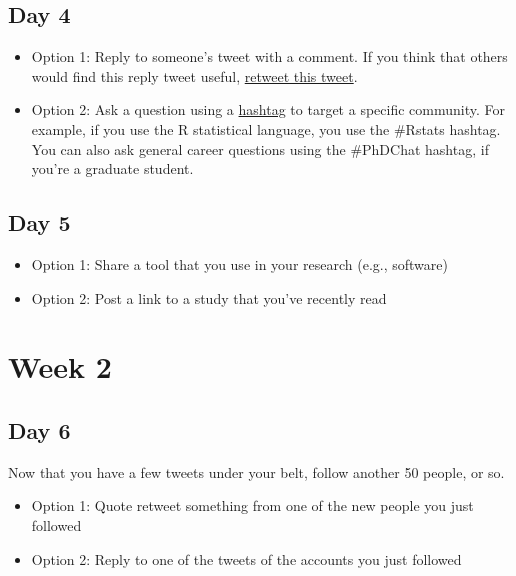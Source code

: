 \documentclass[
]{book}
\providecommand{\tightlist}{%
  \setlength{\itemsep}{0pt}\setlength{\parskip}{0pt}}
\begin{document}
\hypertarget{day-4}{%
\subsection*{Day 4}\label{day-4}}

\begin{itemize}
\tightlist
\item
  Option 1: Reply to someone's tweet with a comment. If you think that others would find this reply tweet useful, \protect\hyperlink{advanced}{retweet this tweet}.
\item
  Option 2: Ask a question using a \protect\hyperlink{intermediate}{hashtag} to target a specific community. For example, if you use the R statistical language, you use the \#Rstats hashtag. You can also ask general career questions using the \#PhDChat hashtag, if you're a graduate student.
\end{itemize}

\hypertarget{day-5}{%
\subsection*{Day 5}\label{day-5}}

\begin{itemize}
\tightlist
\item
  Option 1: Share a tool that you use in your research (e.g., software)
\item
  Option 2: Post a link to a study that you've recently read
\end{itemize}

\hypertarget{week-2}{%
\section*{Week 2}\label{week-2}}

\hypertarget{day-6}{%
\subsection*{Day 6}\label{day-6}}

Now that you have a few tweets under your belt, follow another 50 people, or so.

\begin{itemize}
\item
  Option 1: Quote retweet something from one of the new people you just followed
\item
  Option 2: Reply to one of the tweets of the accounts you just followed
\end{itemize}
\end{document}
